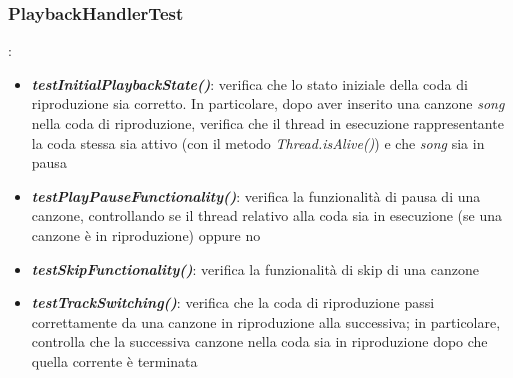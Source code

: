 \documentclass{article}
\begin{document}
  \subsubsection{PlaybackHandlerTest}:
  \begin{itemize}

    \item \textbf{\textit{testInitialPlaybackState()}}: verifica che lo stato iniziale della coda di riproduzione sia corretto. In particolare,
    dopo aver inserito una canzone \textit{song} nella coda di riproduzione, verifica che il thread in esecuzione rappresentante la coda stessa sia attivo (con il metodo \textit{Thread.isAlive()}) e che \textit{song} sia in pausa

    \item \textbf{\textit{testPlayPauseFunctionality()}}: verifica la funzionalità di pausa di una canzone, controllando se il thread relativo alla coda sia in esecuzione (se una canzone è in riproduzione) oppure no

    \item \textbf{\textit{testSkipFunctionality()}}: verifica la funzionalità di skip di una canzone

    \item \textbf{\textit{testTrackSwitching()}}: verifica che la coda di riproduzione passi correttamente da una canzone in riproduzione alla successiva; in particolare, controlla che la successiva canzone nella coda sia in riproduzione dopo che quella corrente è terminata

  \end{itemize}
\end{document}
